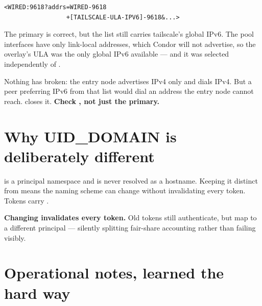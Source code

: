 \begin{lstlisting}[style=term]
<WIRED:9618?addrs=WIRED-9618
                 +[TAILSCALE-ULA-IPV6]-9618&...>
\end{lstlisting}

The primary is correct, but the  list still carries tailscale's
global IPv6. The pool interfaces have only link-local  addresses,
which Condor will not advertise, so the overlay's ULA was the only global IPv6
available --- and it was selected independently of .

\begin{keypoint}
Nothing has broken: the entry node advertises IPv4 only and dials IPv4. But a
peer preferring IPv6 from that list would dial an address the entry node cannot
reach.  closes it. \textbf{Check , not
just the primary.}
\end{keypoint}

\section{Why UID\_DOMAIN is deliberately different}

 is a principal namespace and is never resolved as a hostname.
Keeping it distinct from  means the naming scheme can
change without invalidating every token. Tokens carry
.

\begin{trap}
\textbf{Changing  invalidates every token.} Old tokens still
authenticate, but map to a different principal --- silently splitting fair-share
accounting rather than failing visibly.
\end{trap}

\section{Operational notes, learned the hard way}

